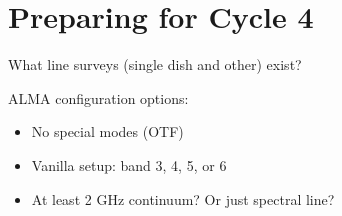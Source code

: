 \section{Preparing for Cycle 4}

What line surveys (single dish and other) exist?




ALMA configuration options:

\begin{itemize}
    \item No special modes (OTF)
    \item Vanilla setup: band 3, 4, 5, or 6
    \item At least 2 GHz continuum?  Or just spectral line?
\end{itemize}